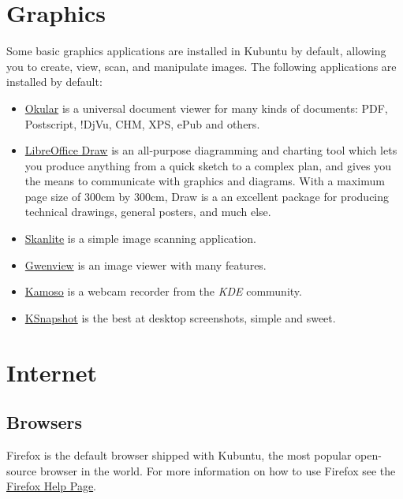 \documentclass[letterpaper,10pt,english]{sphinxmanual}
\begin{document}
\section{Graphics}
\label{docs/software:graphics}
Some basic graphics applications are installed in Kubuntu by default, allowing you to create, view, scan, and manipulate images. The following applications are installed by default:
\begin{itemize}
\item {} 
\href{https://userbase.kde.org/Special:MyLanguage/Okular}{Okular} is a universal document viewer for many kinds of documents: PDF, Postscript, !DjVu, CHM, XPS, ePub and others.

\item {} 
\href{http://www.libreoffice.org/discover/draw/}{LibreOffice Draw} is an all-purpose diagramming and charting tool which lets you produce anything from a quick sketch to a complex plan, and gives you the means to communicate with graphics and diagrams. With a maximum page size of 300cm by 300cm, Draw is a an excellent package for producing technical drawings, general posters, and much else.

\item {} 
\href{https://userbase.kde.org/Special:MyLanguage/Skanlite}{Skanlite} is a simple image scanning application.

\item {} 
\href{https://userbase.kde.org/Special:MyLanguage/Gwenview}{Gwenview} is an image viewer with many features.

\item {} 
\href{https://userbase.kde.org/Special:MyLanguage/Kamoso}{Kamoso} is a webcam recorder from the \emph{KDE} community.

\item {} 
\href{https://userbase.kde.org/Special:MyLanguage/KSnapshot}{KSnapshot} is the best at desktop screenshots, simple and sweet.

\end{itemize}


\section{Internet}
\label{docs/software:internet}

\subsection{Browsers}
\label{docs/software:browsers}
Firefox is the default browser shipped with Kubuntu, the most popular open-source browser in the world. For more information on how to use Firefox see the \href{https://support.mozilla.org/en-US/products/firefox}{Firefox Help Page}.
\end{document}
